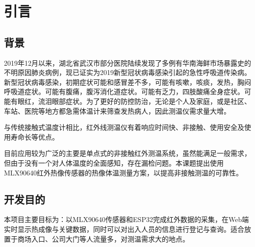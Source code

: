 \chapter{引言}
\section{背景}
2019年12月以来，湖北省武汉市部分医院陆续发现了多例有华南海鲜市场暴露史的不明原因肺炎病例，现已证实为2019新型冠状病毒感染引起的急性呼吸道传染病。新型冠状病毒感染，初期症状可能和感冒差不多，可能有咳嗽，咳痰，发热，胸闷呼吸道症状。可能有腹痛，腹泻消化道症状。可能有乏力，四肢酸痛全身症状。可能有眼红，流泪眼部症状。为了更好的防控防治，无论是个人及家庭，或是社区、车站、医院等地方都急需体温计来筛查发热病人，因此测温仪需求量大增。

与传统接触式温度计相比，红外线测温仪有着响应时间快、非接触、使用安全及使用寿命长等优点。

目前应用较为广泛的主要是单点式的非接触红外测温系统，虽然能满足一般需求，但由于没有一个对人体温度的全面感知，存在漏检问题。本课题提出使用MLX90640红外热像传感器的热像体温测量方案，以提高非接触测温的可靠性。
\section{开发目的}
本项目主要目标为：以MLX90640传感器和ESP32完成红外数据的采集，在Web端实时显示热成像与关键数据，同时可以对出入人员的信息进行登记与查询。适合放置于商场入口、公司大门等人流量多，对测温需求大的地点。
